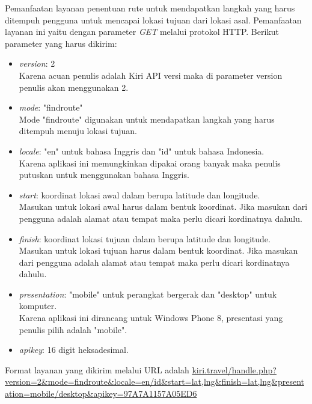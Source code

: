 Pemanfaatan layanan penentuan rute untuk mendapatkan langkah yang harus ditempuh pengguna untuk mencapai lokasi tujuan dari lokasi asal. Pemanfaatan layanan ini yaitu dengan parameter \textit{GET} melalui protokol HTTP. Berikut parameter yang harus dikirim:
\begin{itemize}
	\item \textit{version}: 2 \\
	Karena acuan penulis adalah Kiri API versi maka di parameter version penulis akan menggunakan 2.
	\item \textit{mode}: "findroute" \\
	Mode "findroute" digunakan untuk mendapatkan langkah yang harus ditempuh menuju lokasi tujuan.
	\item \textit{locale}: "en" untuk bahasa Inggris dan "id" untuk bahasa Indonesia. \\
	Karena aplikasi ini memungkinkan dipakai orang banyak maka penulis putuskan untuk menggunakan bahasa Inggris.
	\item \textit{start}: koordinat lokasi awal dalam berupa latitude dan longitude. \\
	Masukan untuk lokasi awal harus dalam bentuk koordinat. Jika masukan dari pengguna adalah alamat atau tempat maka perlu dicari kordinatnya dahulu.
	\item \textit{finish}: koordinat lokasi tujuan dalam berupa latitude dan longitude. \\
	Masukan untuk lokasi tujuan harus dalam bentuk koordinat. Jika masukan dari pengguna adalah alamat atau tempat maka perlu dicari kordinatnya dahulu.
	\item \textit{presentation}: "mobile" untuk perangkat bergerak dan "desktop" untuk komputer. \\
	Karena aplikasi ini dirancang untuk Windows Phone 8, presentasi yang penulis pilih adalah "mobile".
	\item \textit{apikey}: 16 digit heksadesimal.
\end{itemize}

Format layanan yang dikirim melalui URL adalah \url{kiri.travel/handle.php?version=2&mode=findroute&locale=en/id&start=lat,lng&finish=lat,lng&presentation=mobile/desktop&apikey=97A7A1157A05ED6}

